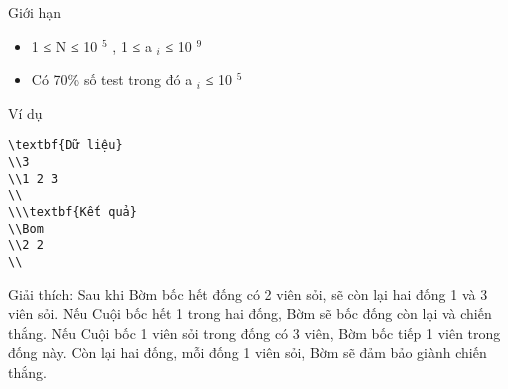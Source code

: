 Giới hạn
\begin{itemize}
	\item     1 ≤ N ≤ 10    $^     5    $    , 1 ≤ a    $_     i    $    ≤ 10    $^     9    $
	\item     Có 70\% số test trong đó a    $_     i    $    ≤ 10    $^     5    $
\end{itemize}
Ví dụ
\begin{verbatim}
\textbf{Dữ liệu}
\\3
\\1 2 3 
\\
\\\textbf{Kết quả}
\\Bom
\\2 2
\\\end{verbatim}

   Giải thích: Sau khi Bờm bốc hết đống có 2 viên sỏi, sẽ còn lại hai đống 1 và 3 viên sỏi. Nếu Cuội bốc hết 1 trong hai đống, Bờm sẽ bốc đống còn lại và chiến thắng. Nếu Cuội bốc 1 viên sỏi trong đống có 3 viên, Bờm bốc tiếp 1 viên trong đống này. Còn lại hai đống, mỗi đống 1 viên sỏi, Bờm sẽ đảm bảo giành chiến thắng.